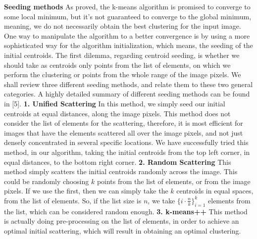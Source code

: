 \documentclass[12pt]{article}
\begin{document}
\textbf{\large Seeding methods} \newline
As proved, the k-means algorithm is promised to converge to some local minimum, but it's not guaranteed to converge to the global minimum, \newline
meaning, we do not necessarily obtain the best clustering for the input image. \newline
One way to manipulate the algorithm to a better convergence is by using a more sophisticated way for the algorithm initialization, which means, the seeding of the initial centroids. \newline
The first dilemma, regarding centroid seeding, is whether we should take as centroids only points from the list of elements, on which we perform the clustering or points from the whole range of the image pixels. \newline
We shall review three different seeding methods, and relate them to these two general categories. \newline
A highly detailed summary of different seeding methods can be found in [5].
\newpage
\textbf{1. Unified Scattering} \newline
In this method, we simply seed our initial centroids at equal distances, along the image pixels. This method does not consider the list of elements for the scattering, therefore, it is most efficient for images that have the elements scattered all over the image pixels, and not just densely concentrated in several specific locations. \newline
We have successfully tried this method, in our algorithm, taking the initial centroids from the top left corner, in equal distances, to the bottom right corner. \newline \newline
\textbf{2. Random Scattering} \newline
This method simply scatters the initial centroids randomly across the image.  This could be randomly choosing $k$ points from the list of elements, or from the image pixels. If we use the first, then we can simply take the $k$ centroids in equal spaces, from the list of elements. So, if the list size is $n$, we take $\{i \cdot \frac{n}{k}\}_{i=1}^k$ elements from the list, which can be considered random enough. \newline \newline
\textbf{3. k-means++} \newline
This method is actually doing pre-processing on the list of elements, in order to achieve an optimal initial scattering, which will result in obtaining an optimal clustering. \newline
\end{document}
